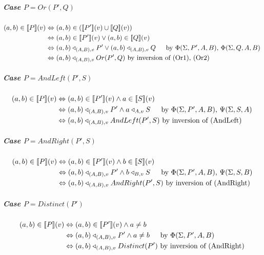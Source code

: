 \documentclass[12pt,a4paper,twoside,openright]{report}
\newcommand{\db}[1]{{\bf [\![}#1{\bf ]\!]}}
\newcommand{\deno}[1]{\db{#1}(v)}
\newcommand{\denoRule}[2]{#1 \in \deno{#2}}
\newcommand{\opRule}[3]{#1 \triangleleft_{#2, v} #3}
\newcommand{\phiRule}[3]{\Phi(\Sigma, #1, #2, #3)}
\newcommand{\psiRule}[2]{\Psi(\Sigma, #1, #2)}
\begin{document}
\subparagraph{Case $P = Or(P', Q)$}
\begin{equation} \label{case Or(P', Q)}
\begin{split}
\denoRule{(a, b)}{P} & \Leftrightarrow (a, b) \in (\deno{P'} \cup \deno{Q})\\
					& \Leftrightarrow \denoRule{(a, b)}{P'} \vee \denoRule{(a, b)}{Q}\\
					&\Leftrightarrow \opRule{(a,b)}{(A, B)}{P'} \vee \opRule{(a,b)}{(A, B)}{Q}\indent\mbox{by $\phiRule{P'}{A}{B}$, $\phiRule{Q}{A}{B}$} \\
					& \Leftrightarrow \opRule{(a, b)}{(A, B)}{Or(P', Q)} \mbox{ by inversion of (Or1), (Or2)}\\\end{split}
\end{equation}

\subparagraph{Case $P = AndLeft(P', S)$}
\begin{equation} \label{case AndLeft(P', Q)}
\begin{split}
\denoRule{(a, b)}{P} & \Leftrightarrow \denoRule{(a, b)}{P'} \wedge \denoRule{a}{S}\\
					&\Leftrightarrow \opRule{(a,b)}{(A, B)}{P'} \wedge \opRule{a}{A}{S}\indent\mbox{by $\phiRule{P'}{A}{B}$, $\psiRule{S}{A}$} \\
					& \Leftrightarrow \opRule{(a, b)}{(A, B)}{AndLeft(P', S)} \mbox{ by inversion of (AndLeft)}\\\end{split}
\end{equation}

\subparagraph{Case $P = AndRight(P', S)$}
\begin{equation} \label{case AndRight(P', Q)}
\begin{split}
\denoRule{(a, b)}{P} & \Leftrightarrow \denoRule{(a, b)}{P'} \wedge \denoRule{b}{S}\\
					&\Leftrightarrow \opRule{(a,b)}{(A, B)}{P'} \wedge \opRule{b}{B}{S}\indent\mbox{by $\phiRule{P'}{A}{B}$, $\psiRule{S}{B}$} \\
					& \Leftrightarrow \opRule{(a, b)}{(A, B)}{AndRight(P', S)} \mbox{ by inversion of (AndRight)}\\\end{split}
\end{equation}

\subparagraph{Case $P = Distinct(P')$}
\begin{equation} \label{case Distinct(P)}
\begin{split}
\denoRule{(a, b)}{P} & \Leftrightarrow \denoRule{(a, b)}{P'} \wedge a \neq b \\
					&\Leftrightarrow \opRule{(a,b)}{(A, B)}{P'} \wedge a \neq b\indent\mbox{by $\phiRule{P'}{A}{B}$} \\
					& \Leftrightarrow \opRule{(a, b)}{(A, B)}{Distinct(P')} \mbox{ by inversion of (AndRight)}\\\end{split}
\end{equation}
\end{document}
